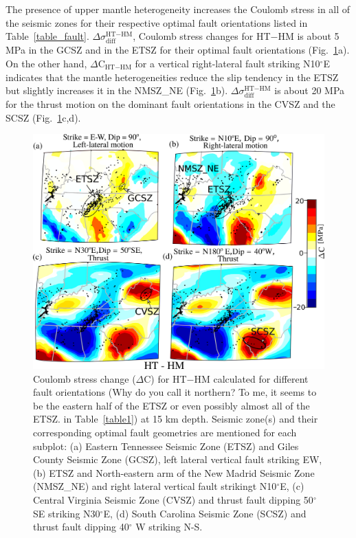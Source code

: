 \documentclass[draft,linenumbers]{agujournal2018}
\begin{document}
The presence of upper mantle heterogeneity increases the Coulomb stress in  all of the seismic zones for their respective optimal fault orientations listed in Table~\ref{table_fault}. $\Delta \sigma_{\text{diff}}^{\text{HT}-\text{HM}}$, Coulomb stress changes for HT$-$HM
is about 5 MPa in the GCSZ and in the  ETSZ for their optimal fault orientations (Fig.~\ref{ht_hm_cs}a). On the other hand, $\Delta$C$_{\text{HT}-\text{HM}}$ 
for a vertical right-lateral fault striking N10$^{\circ}$E 
indicates that the mantle heterogeneities reduce the slip tendency in the ETSZ but slightly increases it in the NMSZ\_NE (Fig.~\ref{ht_hm_cs}b). 
$\Delta \sigma_{\text{diff}}^{\text{HT}-\text{HM}}$ is about 20 MPa for the thrust motion on the dominant fault orientations in the CVSZ and the SCSZ (Fig.~\ref{ht_hm_cs}c,d). 
%
\begin{figure}[h!]
    \centering
    \includegraphics[width=0.75\linewidth]{figures/cs_ht_hm.png}
    \caption{Coulomb stress change ($\Delta$C) for HT$-$HM calculated for different fault orientations ({Why do you call it northern? To me, it seems to be the eastern half of the ETSZ or even possibly almost all of the ETSZ.} in Table~\ref{table1}) at 15 km depth. Seismic zone(s) and their corresponding optimal fault geometries are mentioned for each subplot: (a) Eastern Tennessee Seismic Zone (ETSZ) and Giles County Seismic Zone (GCSZ), left lateral vertical fault striking EW, (b) ETSZ and North-eastern arm of the New Madrid Seismic Zone (NMSZ\_NE) and right lateral vertical fault strikingt N10$^\circ$E, (c) Central Virginia Seismic Zone (CVSZ) and thrust fault dipping 50$^\circ$ SE striking N30$^\circ$E, (d) South Carolina Seismic Zone (SCSZ) and thrust fault dipping 40$^\circ$ W striking N-S.}	
    \label{ht_hm_cs}
\end{figure}
\end{document}

